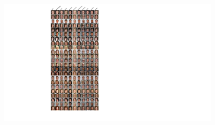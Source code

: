 \documentclass[letterpaper]{article} %
\begin{document}
\begin{figure}[H]
\begin{center}
	\includegraphics[height=1.7\columnwidth]{Figures/App_all_attribute_old}
\end{center}
\end{figure}
\end{document}
